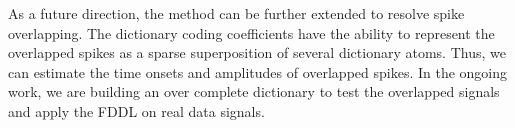 \documentclass[conference]{IEEEtran}
\begin{document}
	As a future direction, the method can be further extended to resolve spike overlapping. The dictionary coding coefficients have the ability to represent the overlapped spikes as a sparse superposition of several dictionary atoms. Thus, we can estimate the time onsets and amplitudes of overlapped spikes. In the ongoing work, we are building an over complete dictionary to test the overlapped signals and apply the FDDL on real data signals.
	
	
	
\end{document}
